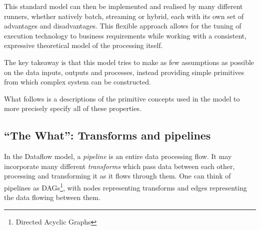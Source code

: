 This standard model can then be implemented and realised by many different runners, whether natively batch, streaming or hybrid, each with its own set of advantages and disadvantages. 
This flexible approach allows for the tuning of execution technology to business requirements while working with a consistent, expressive theoretical model of the processing itself.

The key takeaway is that this model tries to make as few assumptions as possible on the data inputs, outputs and processes, instead providing simple primitives from which complex system can be constructed.

What follows is a descriptions of the primitive concepts used in the model to more precisely specify all of these properties.

\subsection{``The What'': Transforms and pipelines}\label{sec:prep:dataflow:what}

In the Dataflow model, a \emph{pipeline} is an entire data processing flow.
It may incorporate many different \emph{transforms} which pass data between each other, processing and transforming it as it flows through them.
One can think of pipelines as DAGs\footnote{Directed Acyclic Graphs}, with nodes representing transforms and edges representing the data flowing between them.

